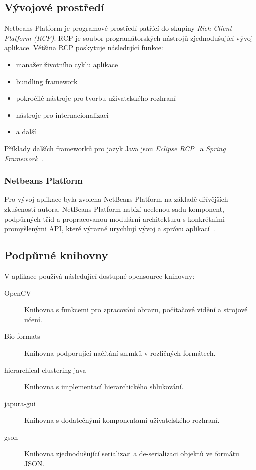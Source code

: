 \documentclass[11pt,twoside,a4paper,table]{book}
\begin{document}
\subsection{Vývojové prostředí}
Netbeans Platform je programové prostředí patřící do skupiny \textit{Rich Client Platform (RCP)}. RCP je soubor programátorských nástrojů zjednodušující vývoj aplikace. Většina RCP poskytuje následující funkce:
\begin{itemize}
	\item manažer životního cyklu aplikace
	\item bundling framework
	\item pokročilé nástroje pro tvorbu uživatelského rozhraní
	\item nástroje pro internacionalizaci
	\item a další
\end{itemize}

Příklady dalších frameworků pro jazyk Java jsou \textit{Eclipse RCP}~\cite{sw:eclipse_rcp} a \textit{Spring Framework}~\cite{sw:spring_framework}.

\subsubsection{Netbeans Platform}
Pro vývoj aplikace byla zvolena NetBeans Platform na základě dřívějších zkušeností autora. NetBeans Platform nabízí ucelenou sadu komponent, podpůrných tříd a propracovanou modulární architekturu s konkrétními promyšlenými API, které výrazně urychlují vývoj a správu aplikací~\cite{book:nb_guide}\cite{book:nb_for_beginers}.

\subsection{Podpůrné knihovny}
V aplikace používá následující dostupné opensource knihovny:
\begin{description}
	\item[OpenCV] Knihovna s funkcemi pro zpracování obrazu, počítačové vidění a strojové učení.
	\item[Bio-formats] Knihovna podporující načítání snímků v rozličných formátech.
	\item[hierarchical-clustering-java] Knihovna s implementací hierarchického shlukování.
	\item[japura-gui] Knihovna s dodatečnými komponentami uživatelského rozhraní.
	\item[gson] Knihovna zjednodušující serializaci a de-serializaci objektů ve formátu JSON.
\end{description}
\end{document}
